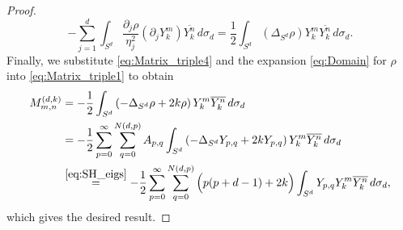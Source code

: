 \documentclass[11pt]{amsart}
\theoremstyle{definition}
\theoremstyle{plain}
\theoremstyle{remark}
\newcommand{\del}{\partial}
\newcommand{\cc}{\overline}
\begin{document}
\begin{proof}
\begin{equation}
-\sum_{j = 1}^d \int_{S^d} \frac{\del_j\rho}{\eta_j^2}\left(\del_jY_k^m\right)\cc{Y_k^n}\, d\sigma_d = \frac{1}{2}\int_{S^d} \left(\Delta_{S^d}\rho\right) Y_k^m\cc{Y_k^n}\, d\sigma_d. 
\end{equation} 
Finally, we substitute \eqref{eq:Matrix_triple4} and the expansion \eqref{eq:Domain} for $\rho$ into \eqref{eq:Matrix_triple1} to obtain 
\begin{align*} 
M_{m, n}^{(d, k)} & = -\frac{1}{2}\int_{S^d} \left(-\Delta_{S^d}\rho + 2k\rho\right)Y_k^m\cc{Y_k^n}\, d\sigma_d \\ 
& = -\frac{1}{2}\sum_{p = 0}^\infty \sum_{q = 0}^{N(d, p)} A_{p, q}\int_{S^d} \left(-\Delta_{S^d}Y_{p, q} + 2kY_{p, q}\right)Y_k^m\cc{Y_k^n}\, d\sigma_d \\ 
& \stackrel{\eqref{eq:SH_eigs}}{=} -\frac{1}{2}\sum_{p = 0}^\infty \sum_{q = 0}^{N(d, p)} \Big(p(p + d - 1) + 2k\Big)\int_{S^d} Y_{p, q}Y_k^m\cc{Y_k^n}\, d\sigma_d, 
\end{align*} 
which gives the desired result. 
\end{proof} 
\end{document}
